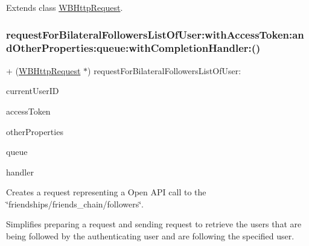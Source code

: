 Extends class \mbox{\hyperlink{interface_w_b_http_request_a158110b5d079d1ddd7baae029a8a36fb}{W\+B\+Http\+Request}}.

\mbox{\label{category_w_b_http_request_07_weibo_user_08_a5c4b501746e378232db99ae045e49889}} 
\subsubsection{\texorpdfstring{request\+For\+Bilateral\+Followers\+List\+Of\+User\+:with\+Access\+Token\+:and\+Other\+Properties\+:queue\+:with\+Completion\+Handler\+:()}{requestForBilateralFollowersListOfUser:withAccessToken:andOtherProperties:queue:withCompletionHandler:()}\hspace{0.1cm}{\footnotesize\ttfamily [1/3]}}
{\footnotesize\ttfamily + (\mbox{\hyperlink{interface_w_b_http_request}{W\+B\+Http\+Request}} $\ast$) request\+For\+Bilateral\+Followers\+List\+Of\+User\+: \begin{DoxyParamCaption}\item[{(N\+S\+String $\ast$)}]{current\+User\+ID }\item[{withAccessToken:(N\+S\+String $\ast$)}]{access\+Token }\item[{andOtherProperties:(N\+S\+Dictionary $\ast$)}]{other\+Properties }\item[{queue:(N\+S\+Operation\+Queue $\ast$)}]{queue }\item[{withCompletionHandler:(W\+B\+Request\+Handler)}]{handler }\end{DoxyParamCaption}}

Creates a request representing a Open A\+PI call to the \char`\"{}friendships/friends\+\_\+chain/followers\char`\"{}.

Simplifies preparing a request and sending request to retrieve the users that are being followed by the authenticating user and are following the specified user.

